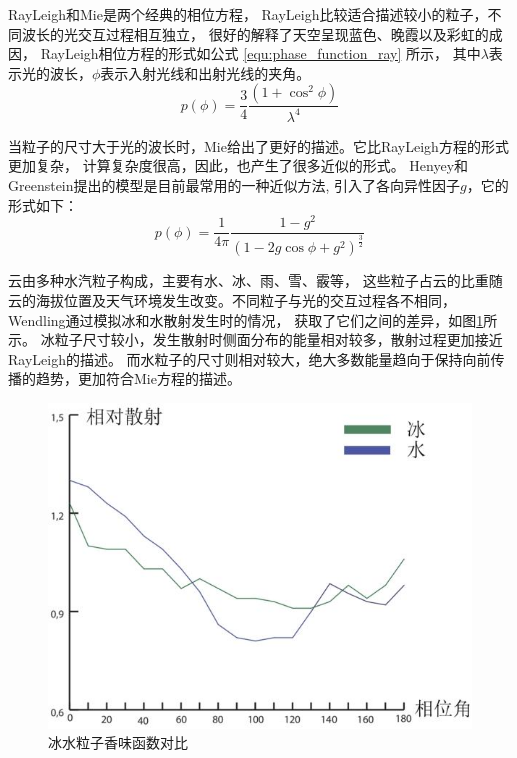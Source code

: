 RayLeigh和Mie是两个经典的相位方程，
RayLeigh比较适合描述较小的粒子，不同波长的光交互过程相互独立，
很好的解释了天空呈现蓝色、晚霞以及彩虹的成因，
RayLeigh相位方程的形式如公式 \ref{equ:phase_function_ray} 所示，
其中$\lambda$表示光的波长，$\phi$表示入射光线和出射光线的夹角。
\begin{equation}
	\label{equ:phase_function_ray}
	p(\phi) = \frac{3}{4}\frac{(1+\cos^{2}\phi)}{\lambda^{4}}
\end{equation}

当粒子的尺寸大于光的波长时，Mie给出了更好的描述。它比RayLeigh方程的形式更加复杂，
计算复杂度很高，因此，也产生了很多近似的形式。
Henyey和Greenstein提出的模型是目前最常用的一种近似方法,
引入了各向异性因子$g$，它的形式如下：
\begin{equation}
	\label{equ:phase_function_henyey}
	p(\phi) = \frac{1}{4\pi}\frac{1-g^2}{(1-2g\cos\phi +g^2)^{\frac{3}{2}}}
\end{equation}

云由多种水汽粒子构成，主要有水、冰、雨、雪、霰等，
这些粒子占云的比重随云的海拔位置及天气环境发生改变。不同粒子与光的交互过程各不相同，
Wendling通过模拟冰和水散射发生时的情况，
获取了它们之间的差异，如图\ref{fig:ice_water_phase_function}所示。
冰粒子尺寸较小，发生散射时侧面分布的能量相对较多，散射过程更加接近RayLeigh的描述。
而水粒子的尺寸则相对较大，绝大多数能量趋向于保持向前传播的趋势，更加符合Mie方程的描述。
\begin{figure}
\centering
\includegraphics{figure/ice_water_phase_function.jpg}
\caption{冰水粒子香味函数对比}
\label{fig:ice_water_phase_function}
\end{figure}

